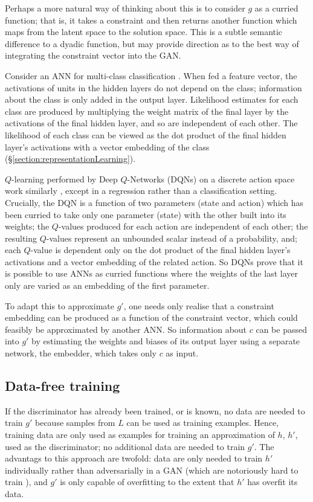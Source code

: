\documentclass[../../main.tex]{subfiles}
\begin{document}
Perhaps a more natural way of thinking about this is to consider $g$ as a curried function; that is, it takes a constraint and then returns another function which maps from the latent space to the solution space.
This is a subtle semantic difference to a dyadic function, but may provide direction as to the best way of integrating the constraint vector into the GAN.

Consider an ANN for multi-class classification \cite{ou07}.
When fed a feature vector, the activations of units in the hidden layers do not depend on the class; information about the class is only added in the output layer.
Likelihood estimates for each class are produced by multiplying the weight matrix of the final layer by the activations of the final hidden layer, and so are independent of each other.
The likelihood of each class can be viewed as the dot product of the final hidden layer's activations with a vector embedding of the class (\S\ref{section:representationLearning}).

$Q$-learning performed by Deep $Q$-Networks (DQNs) on a discrete action space work similarly \cite{mnih15}, except in a regression rather than a classification setting.
Crucially, the DQN is a function of two parameters (state and action) which has been curried to take only one parameter (state) with the other built into its weights; the $Q$-values produced for each action are independent of each other; the resulting $Q$-values represent an unbounded scalar instead of a probability, and; each $Q$-value is dependent only on the dot product of the final hidden layer's activations and a vector embedding of the related action.
So DQNs prove that it is possible to use ANNs as curried functions where the weights of the last layer only are varied as an embedding of the first parameter.

To adapt this to approximate $g'$, one needs only realise that a constraint embedding can be produced as a function of the constraint vector, which could feasibly be approximated by another ANN.
So information about $c$ can be passed into $g'$ by estimating the weights and biases of its output layer using a separate network, the embedder, which takes only $c$ as input.

\subsection{Data-free training} \label{subsection:dataFreeTraining}

If the discriminator has already been trained, or is known, no data are needed to train $g'$ because samples from $L$ can be used as training examples.
Hence, training data are only used as examples for training an approximation of $h$, $h'$, used as the discriminator; no additional data are needed to train $g'$.
The advantags to this approach are twofold: data are only needed to train $h'$ individually rather than adversarially in a GAN (which are notoriously hard to train \cite{bang18}), and $g'$ is only capable of overfitting to the extent that $h'$ has overfit its data.
\end{document}
